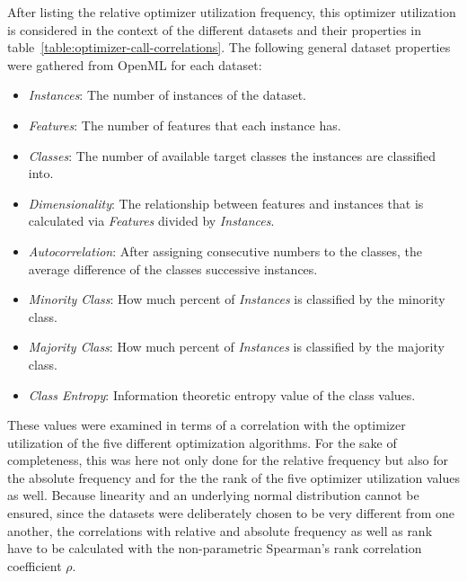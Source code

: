 After listing the relative optimizer utilization frequency, this optimizer utilization is considered in the context of the different datasets and their properties in table~\ref{table:optimizer-call-correlations}.
The following general dataset properties were gathered from OpenML for each dataset:
\begin{itemize}
    \item \textit{Instances}: The number of instances of the dataset.
    \item \textit{Features}: The number of features that each instance has.
    \item \textit{Classes}: The number of available target classes the instances are classified into.
    \item \textit{Dimensionality}: The relationship between features and instances that is calculated via \textit{Features} divided by \textit{Instances}.
    \item \textit{Autocorrelation}: After assigning consecutive numbers to the classes, the average difference of the classes successive instances.
    \item \textit{Minority Class}: How much percent of \textit{Instances} is classified by the minority class.
    \item \textit{Majority Class}: How much percent of \textit{Instances} is classified by the majority class.
    \item \textit{Class Entropy}: Information theoretic entropy value of the class values.
\end{itemize}
These values were examined in terms of a correlation with the optimizer utilization of the five different optimization algorithms.
For the sake of completeness, this was here not only done for the relative frequency but also for the absolute frequency and for the the rank of the five optimizer utilization values as well.\newline
Because linearity and an underlying normal distribution cannot be ensured, since the datasets were deliberately chosen to be very different from one another, the correlations with relative and absolute frequency as well as rank have to be calculated with the non-parametric Spearman's rank correlation coefficient $\rho$.


